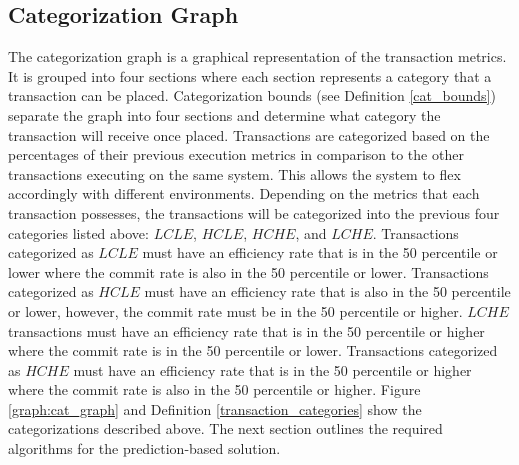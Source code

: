 \subsection{Categorization Graph}
\label{pbs:cat_graph}


The categorization graph is a graphical representation of the transaction metrics. It is grouped into four sections where each section represents a category that a transaction can be placed. Categorization bounds (see Definition \ref{cat_bounds}) separate the graph into four sections and determine what category the transaction will receive once placed. Transactions are categorized based on the percentages of their previous execution metrics in comparison to the other transactions executing on the same system. This allows the system to flex accordingly with different environments. Depending on the metrics that each transaction possesses, the transactions will be categorized into the previous four categories listed above: $LCLE$, $HCLE$, $HCHE$, and $LCHE$. Transactions categorized as $LCLE$ must have an efficiency rate that is in the 50 percentile or lower where the commit rate is also in the 50 percentile or lower. Transactions categorized as $HCLE$ must have an efficiency rate that is also in the 50 percentile or lower, however, the commit rate must be in the 50 percentile or higher. $LCHE$ transactions must have an efficiency rate that is in the 50 percentile or higher where the commit rate is in the 50 percentile or lower. Transactions categorized as $HCHE$ must have an efficiency rate that is in the 50 percentile or higher where the commit rate is also in the 50 percentile or higher. Figure \ref{graph:cat_graph} and Definition \ref{transaction_categories} show the categorizations described above. The next section outlines the required algorithms for the prediction-based solution.

